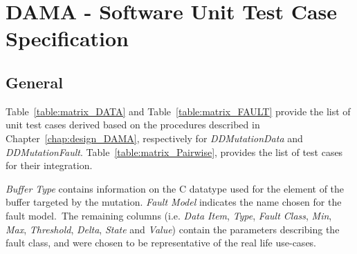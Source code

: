 
\chapter{DAMA - Software Unit Test Case Specification}
\label{chap:spec_DAMA}

\section{General}

Table~\ref{table:matrix_DATA} and Table~\ref{table:matrix_FAULT} provide the list of unit test cases derived based on the procedures described in Chapter~\ref{chap:design_DAMA}, respectively for \emph{DDMutationData} and \emph{DDMutationFault}.
Table~\ref{table:matrix_Pairwise}, provides the list of test cases for their integration.

\emph{Buffer Type} contains information on the C datatype used for the element of the buffer targeted by the mutation.
\emph{Fault Model} indicates the name chosen for the fault model.\
The remaining columns (i.e. \emph{Data Item}, \emph{Type}, \emph{Fault Class}, \emph{Min}, \emph{Max}, \emph{Threshold}, \emph{Delta}, \emph{State}  and \emph{Value}) contain the parameters describing the fault class, and were chosen to be representative of the real life use-cases.






